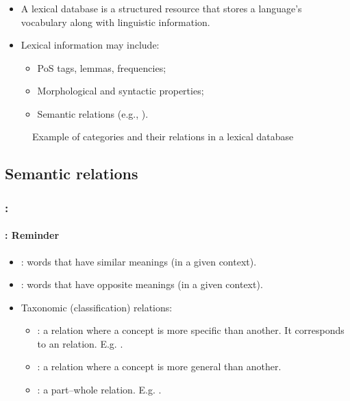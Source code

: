 \documentclass[xcolor=table]{beamer}
\begin{document}
\begin{frame}
	\frametitle{\insertshortsubtitle}
	\framesubtitle{\insertsection}
	
	\begin{itemize}
		\item A lexical database is a structured resource that stores a language's vocabulary along with linguistic information.
		\item Lexical information may include:
		\begin{itemize}
			\item PoS tags, lemmas, frequencies;
			\item Morphological and syntactic properties;
			\item Semantic relations (e.g., ).
		\end{itemize}
	\end{itemize}
	
	\begin{figure}
		\centering 
		\caption{Example of categories and their relations in a lexical database \cite{2019-white-al}}
	\end{figure}
	
\end{frame}


\subsection{Semantic relations}

\begin{frame}
	\frametitle{\insertshortsubtitle: \insertsection}
	\framesubtitle{\insertsubsection: Reminder}
	
	\begin{itemize}
		\item {}: words that have similar meanings (in a given context).
		\item {}: words that have opposite meanings (in a given context).
		\item Taxonomic (classification) relations:
		\begin{itemize}
			\item {}: a relation where a concept is more specific than another. It corresponds to an  relation. E.g. .
			\item {}: a relation where a concept is more general than another.
			\item {}: a part–whole relation. E.g. .
		\end{itemize}
	\end{itemize}
	
\end{frame}
\end{document}
